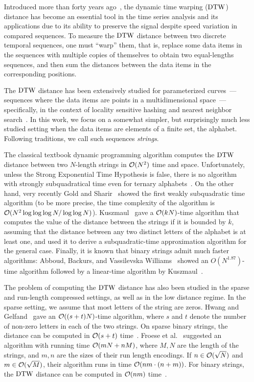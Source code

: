 Introduced more than forty years ago~\cite{sakoe1978dynamic}, the dynamic time warping ($\mathrm{DTW}$) distance has become an essential tool in the time series analysis and its applications due to its ability to preserve the signal despite speed variation in compared sequences. To measure the $\mathrm{DTW}$ distance between two discrete temporal sequences, one must ``warp'' them, that is, replace some data items in the sequences with multiple copies of themselves to obtain two equal-lengths sequences, and then sum the distances between the data items in the corresponding positions. 

The $\mathrm{DTW}$ distance has been extensively studied for parameterized curves~--- sequences where the data items are points in a multidimensional space~---  specifically, in the context of locality sensitive hashing and nearest neighbor search~\cite{LSH,ANN}. In this work, we focus on a somewhat simpler, but surprisingly much less studied setting when the data items are elements of a finite set, the alphabet. Following traditions, we call such sequences \emph{strings}. 

The classical textbook dynamic programming algorithm computes the $\mathrm{DTW}$ distance between two $N$-length strings in $\mathcal{O}(N^2)$ time and space. Unfortunately, unless the Strong Exponential Time Hypothesis is false, there is no algorithm with strongly subquadratical time even for ternary alphabets~\cite{DBLP:conf/focs/AbboudBW15,DBLP:conf/focs/BringmannK15,DBLP:conf/icalp/Kuszmaul19}. On the other hand, very recently Gold and Sharir~\cite{DBLP:journals/talg/GoldS18} showed the first weakly subquadratic time algorithm (to be more precise, the time complexity of the algorithm is~$\mathcal{O}(N^2 \log \log  \log N / \log \log N)$). Kuszmaul~\cite{DBLP:conf/icalp/Kuszmaul19} gave a $\mathcal{O}(kN)$-time algorithm that computes the value of the distance between the strings if it is bounded by $k$, assuming that the distance between any two distinct letters of the alphabet is at least one, and used it to derive a subquadratic-time approximation algorithm for the general case. Finally, it is known that binary strings admit much faster algorithms: Abboud, Backurs, and Vassilevska Williams~\cite{DBLP:conf/focs/AbboudBW15} showed an $O(N^{1.87})$-time algorithm followed by a linear-time algorithm by Kuszmaul~\cite{DBLP:journals/corr/abs-2101-01108}. 

The problem of computing the $\mathrm{DTW}$ distance has also been studied in the sparse and run-length compressed settings, as well as in the low distance regime.  
In the sparse setting, we assume that most letters of the string are zeros. Hwang and Gelfand~\cite{hwang2017sparse} gave an $\mathcal{O}((s+t) N)$-time algorithm, where $s$ and $t$ denote the number of non-zero letters in each of the two strings. On sparse binary strings, the distance can be computed in $\mathcal{O}(s+t)$ time~\cite{DBLP:conf/mldm/HwangG19,mueen2016awarp}. Froese et al.~\cite{DBLP:journals/corr/abs-1903-03003} suggested an algorithm with running time $\mathcal{O}(mN+nM)$, where $M,N$ are the length of the strings, and $m, n$ are the sizes of their run length encodings. If $n \in \mathcal{O}(\sqrt{N})$ and $m \in \mathcal{O}(\sqrt{M})$, their algorithm runs in time $\mathcal{O}(nm \cdot (n+m))$. For binary strings, the $\mathrm{DTW}$ distance can be computed in $\mathcal{O}(nm)$ time~\cite{DBLP:conf/pkdd/DupontM15a}. 

